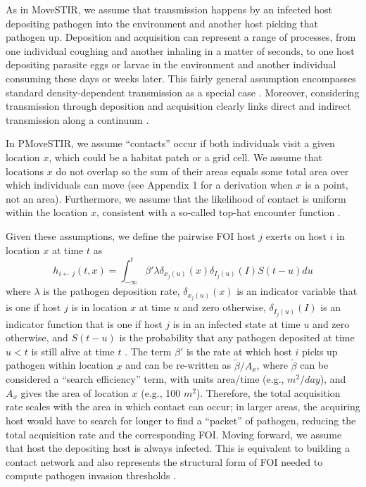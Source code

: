 \documentclass[letterpaper]{article}
\begin{document}
As in MoveSTIR, we assume that transmission happens by an infected host depositing pathogen into the environment and another host picking that pathogen up. 
Deposition and acquisition can represent a range of processes, from one individual coughing and another inhaling in a matter of seconds, to one host depositing parasite eggs or larvae in the environment and another individual consuming these days or weeks later. 
This fairly general assumption encompasses standard density-dependent transmission as a special case \citep{Cortez2021}. 
Moreover, considering transmission through deposition and acquisition clearly links direct and indirect transmission along a continuum \citep{Wilber2022}.

In PMoveSTIR, we assume ``contacts'' occur if both individuals visit a given location $x$, which could be a habitat patch or a grid cell. 
We assume that locations $x$ do not overlap so the sum of their areas equals some total area over which individuals can move (see Appendix 1 for a derivation when $x$ is a point, not an area). 
Furthermore, we assume that the likelihood of contact is uniform within the location $x$, consistent with a so-called top-hat encounter function \citep{Gurarie2013,Wilber2022}.

Given these assumptions, we define the pairwise FOI host $j$ exerts on host $i$ in location $x$ at time $t$ as \citep{Wilber2022}
\begin{equation}
    h_{i \leftarrow j}(t, x) = \int_{-\infty}^{t} \beta' \lambda \delta_{x_j(u)}(x) \delta_{I_j(u)}(I) S(t - u) du
    \label{eq:original_foi}
\end{equation}
where $\lambda$ is the pathogen deposition rate, $\delta_{x_j(u)}(x)$ is an indicator variable that is one if host $j$ is in location $x$ at time $u$ and zero otherwise, $\delta_{I_j(u)}(I)$ is an indicator function that is one if host $j$ is in an infected state at time $u$ and zero otherwise, and $S(t-u)$ is the probability that any pathogen deposited at time $u < t$ is still alive at time $t$ \citep[see][for a full derivation]{Wilber2022}. 
The term $\beta'$ is the rate at which host $i$ picks up pathogen within location $x$ and can be re-written as $\tilde{\beta} / A_x$, where $\tilde{\beta}$ can be considered a ``search efficiency'' term, with units area/time (e.g., $m^2 / day$), and $A_x$ gives the area of location $x$ (e.g., 100 $m^2$). 
Therefore, the total acquisition rate scales with the area in which contact can occur; in larger areas, the acquiring host would have to search for longer to find a ``packet'' of pathogen, reducing the total acquisition rate and the corresponding FOI. Moving forward, we assume that host the depositing host is always infected. This is equivalent to building a contact network and also represents the structural form of FOI needed to compute pathogen invasion thresholds \citep{Wilber2022}.
\end{document}
